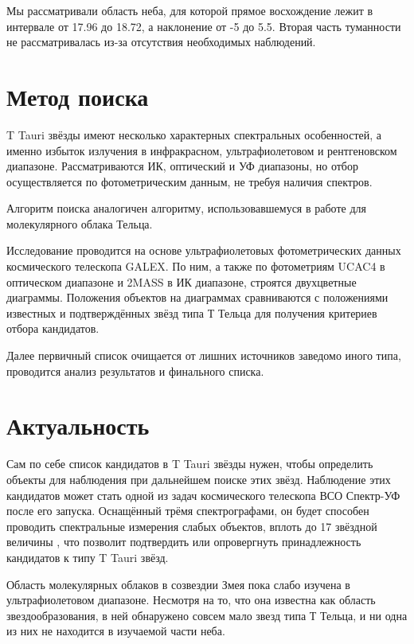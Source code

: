 Мы рассматривали область неба, для которой прямое восхождение лежит в интервале от 17.96 до 18.72, а наклонение от -5 до 5.5. Вторая часть туманности не рассматривалась из-за отсутствия необходимых наблюдений.

\section{Метод поиска}
T Tauri звёзды имеют несколько характерных спектральных особенностей, а именно избыток излучения в инфракрасном, ультрафиолетовом и рентгеновском диапазоне. Рассматриваются ИК, оптический и УФ диапазоны, но отбор осуществляется по фотометрическим данным, не требуя наличия спектров.

Алгоритм поиска аналогичен алгоритму, использовавшемуся в работе \cite{AIGdC2014galex} для молекулярного облака Тельца.

Исследование проводится на основе ультрафиолетовых фотометрических данных космического телескопа GALEX. По ним, а также по фотометриям UCAC4 в оптическом диапазоне и 2MASS в ИК диапазоне, строятся двухцветные диаграммы. Положения объектов на диаграммах сравниваются с положениями известных и подтверждённых звёзд типа Т Тельца для получения критериев отбора кандидатов.

Далее первичный список очищается от лишних источников заведомо иного типа, проводится анализ результатов и финального списка.

\section{Актуальность}
Сам по себе список кандидатов в T Tauri звёзды нужен, чтобы определить объекты для наблюдения при дальнейшем поиске этих звёзд. Наблюдение этих кандидатов может стать одной из задач космического телескопа ВСО Спектр-УФ после его запуска. Оснащённый трёмя спектрографами, он будет способен проводить спектральные измерения слабых объектов, вплоть до 17 звёздной величины \cite{malkov2011scientific}, что позволит подтвердить или опровергнуть принадлежность кандидатов к типу T Tauri звёзд.

Область молекулярных облаков в созвездии Змея пока слабо изучена в ультрафиолетовом диапазоне. Несмотря на то, что она известна как область звездообразования, в ней обнаружено совсем мало звезд типа Т Тельца, и ни одна из них не находится в изучаемой части неба.

